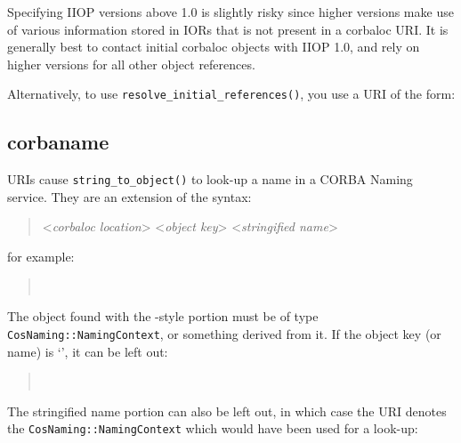 \documentclass[11pt,oneside,a4paper]{book}
\newcommand{\intf}[1]{\texttt{#1}}
\newcommand{\op}[1]{\texttt{#1()}}
\newcommand{\dsc}{\discretionary{}{}{}}
\begin{document}
Specifying IIOP versions above 1.0 is slightly risky since higher
versions make use of various information stored in IORs that is not
present in a corbaloc URI. It is generally best to contact initial
corbaloc objects with IIOP 1.0, and rely on higher versions for all
other object references.


\vspace{\baselineskip}

\noindent Alternatively, to use \op{resolve\_initial\_references}, you
use a URI of the form:

\begin{quote}
\end{quote}


\subsection{corbaname}
\label{sec:corbaname}

 URIs cause \op{string\_to\_object} to look-up a
name in a CORBA Naming service. They are an extension of the
 syntax:

\begin{quote}
%
<\textit{corbaloc location}>%
\corbauri{/}%
<\textit{object key}>%
\corbauri{#}%
<\textit{stringified name}>
\end{quote}

\noindent for example:

\begin{quote}
\\
\end{quote}

\noindent The object found with the -style portion
must be of type \intf{CosNaming::\dsc{}NamingContext}, or something
derived from it. If the object key (or  name) is
`', it can be left out:

\begin{quote}
\\
\end{quote}

\noindent The stringified name portion can also be left out, in which
case the URI denotes the \intf{CosNaming::NamingContext} which would
have been used for a look-up:
\end{document}
